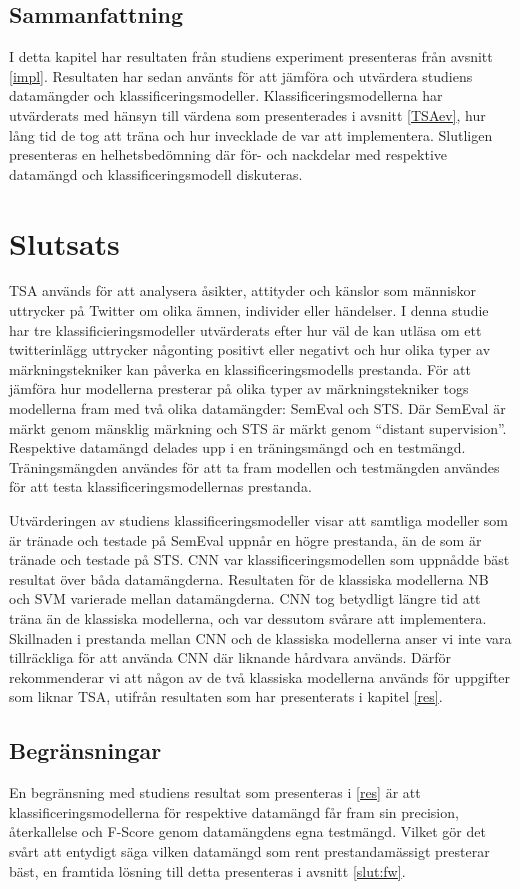 \documentclass{kaumasters} %
\begin{document}
\section{Sammanfattning}
I detta kapitel har resultaten från studiens experiment presenteras från avsnitt \ref{impl}. Resultaten har sedan använts för att jämföra och utvärdera studiens datamängder och klassificeringsmodeller. Klassificeringsmodellerna har utvärderats med hänsyn till värdena som presenterades i avsnitt \ref{TSAev}, hur lång tid de tog att träna och hur invecklade de var att implementera. Slutligen presenteras en helhetsbedömning där för- och nackdelar med respektive datamängd och klassificeringsmodell diskuteras.

\chapter{Slutsats}
TSA används för att analysera åsikter, attityder och känslor som människor uttrycker på Twitter om olika ämnen, individer eller händelser. I denna studie har tre klassificieringsmodeller utvärderats efter hur väl de kan utläsa om ett twitterinlägg uttrycker någonting positivt eller negativt och hur olika typer av märkningstekniker kan påverka en klassificeringsmodells prestanda. För att jämföra hur modellerna presterar på olika typer av märkningstekniker togs modellerna fram med två olika datamängder: SemEval och STS. Där SemEval är märkt genom mänsklig märkning och STS är märkt genom “distant supervision”. Respektive datamängd delades upp i en träningsmängd och en testmängd. Träningsmängden användes för att ta fram modellen och testmängden användes för att testa klassificeringsmodellernas prestanda. 

Utvärderingen av studiens klassificeringsmodeller visar att samtliga modeller som är tränade och testade på SemEval uppnår en högre prestanda, än de som är tränade och testade på STS. CNN var klassificeringsmodellen som uppnådde bäst resultat över båda datamängderna. Resultaten för de klassiska modellerna NB och SVM varierade mellan datamängderna. CNN tog betydligt längre tid att träna än de klassiska modellerna, och var dessutom svårare att implementera. Skillnaden i prestanda mellan CNN och de klassiska modellerna anser vi inte vara tillräckliga för att använda CNN där liknande hårdvara används. Därför rekommenderar vi att någon av de två klassiska modellerna används för uppgifter som liknar TSA, utifrån resultaten som har presenterats i kapitel \ref{res}.
\section{Begränsningar}
En begränsning med studiens resultat som presenteras i \ref{res} är att klassificeringsmodellerna för respektive datamängd får fram sin precision, återkallelse och F-Score genom datamängdens egna testmängd. Vilket gör det svårt att entydigt säga vilken datamängd som rent prestandamässigt presterar bäst, en framtida lösning till detta presenteras i avsnitt \ref{slut:fw}.
\end{document}
